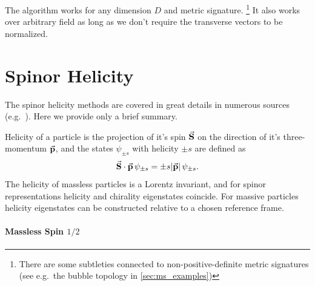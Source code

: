 The algorithm works for any dimension $D$ and metric signature.%
\footnote{There are some subtleties connected to non-positive-definite metric signatures (see e.g.\ the bubble topology in \cref{sec:ms_examples})}
It also works over arbitrary field as long as we don't require the transverse vectors to be normalized.


\chapter{Spinor Helicity}
\label{chap:4dspinhel}

The spinor helicity methods are covered in great details in numerous sources (e.g.\ \cite{Maitre:2007jq,Kuczmarski:2014ara,Weinzierl:2016bus,DittmaierWeyl,Cohen:2010mi}).
Here we provide only a brief summary.

Helicity of a particle is the projection of it's spin $\va{S}$ on the direction of it's
three-momentum $\va{p}$, and the states $\psi_{\pm s}$ with helicity $\pm s$ are defined as
\begin{equation} \label{eq:helicity_def}
  \sp(\va{S},\va{p}) \, \psi_{\pm s} = \pm s \abs{\va{p}}\, \psi_{\pm s}.
\end{equation}
The helicity of massless particles is a Lorentz invariant, and for spinor representations helicity and chirality eigenstates
coincide. 
For massive particles helicity eigenstates can be constructed relative to a chosen reference frame.


\subsubsection{Massless Spin $1/2$}

